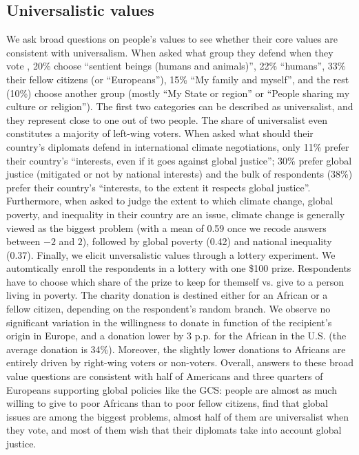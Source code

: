 \subsection{Universalistic values}
We ask broad questions on people's values to see whether their core values are consistent with universalism. When asked what group they defend when they vote%
, 20\% choose ``sentient beings (humans and animals)'', 22\% ``humans'', 33\% their fellow citizens (or ``Europeans''), 15\% ``My family and myself'', and the rest (10\%) choose another group (mostly ``My State or region'' or ``People sharing my culture or religion''). The first two categories can be described as universalist, and they represent close to one out of two people. The share of universalist even constitutes a majority of left-wing voters. %
When asked what should their country's diplomats defend in international climate negotiations, only 11\% prefer their country's ``interests, even if it goes against global justice''; 30\% prefer global justice (mitigated or not by national interests) and the bulk of respondents (38\%) prefer their country's ``interests, to the extent it respects global justice''. %
Furthermore, when asked to judge the extent to which climate change, global poverty, and inequality in their country are an issue, climate change is generally viewed as the biggest problem (with a mean of 0.59 once we recode answers between $-2$ and $2$), followed by global poverty (0.42) and national inequality (0.37). %
Finally, we elicit unversalistic values through a lottery experiment. We automtically enroll the respondents in a lottery with one \$100 prize. Respondents have to choose which share of the prize to keep for themself vs. give to a person living in poverty. The charity donation is destined either for an African or a fellow citizen, depending on the respondent's random branch. We observe no significant variation in the willingness to donate in function of the recipient's origin in Europe, and a donation lower by 3 p.p. for the African in the U.S. (the average donation is 34\%). Moreover, the slightly lower donations to Africans are entirely driven by right-wing voters or non-voters. 
Overall, answers to these broad value questions are consistent with half of Americans and three quarters of Europeans supporting global policies like the GCS: people are almost as much willing to give to poor Africans than to poor fellow citizens, find that global issues are among the biggest problems, almost half of them are universalist when they vote, and most of them wish that their diplomats take into account global justice.



